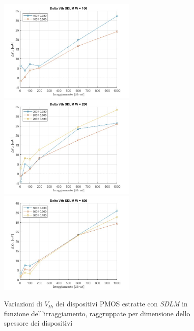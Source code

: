 \documentclass[12pt, letterpaper]{book}
\begin{document}
\begin{figure}[H]
  \centering
  \includegraphics[width=0.6\textwidth]{sovrapposizione-deltaVth-SDLM-P100}
  \includegraphics[width=0.6\textwidth]{sovrapposizione-deltaVth-SDLM-P200}
  \includegraphics[width=0.6\textwidth]{sovrapposizione-deltaVth-SDLM-P600}
  \caption{Variazioni di $V_{th}$ dei dispositivi PMOS estratte con \emph{SDLM} in funzione dell'irraggiamento, raggruppate per dimensione dello spessore dei dispositivi}
\end{figure}
\end{document}
